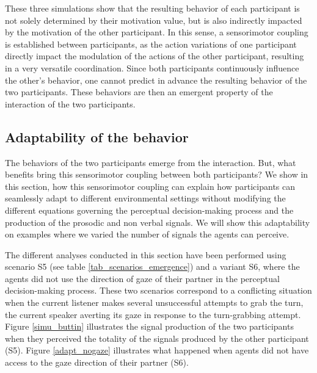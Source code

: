 These three simulations show that the resulting behavior of each participant is not solely determined by their motivation value, but is also indirectly impacted by the motivation of the other participant. In this sense, a sensorimotor coupling is established between participants, as the action variations of one participant directly impact the modulation of the actions of the other participant, resulting in a very versatile coordination. Since both participants continuously influence the other's behavior, one cannot predict in advance the resulting behavior of the two participants. These behaviors are then an emergent property of the interaction of the two participants. 

\subsection{Adaptability of the behavior}

The behaviors of the two participants emerge from the interaction. But, what benefits bring this sensorimotor coupling between both participants?
We show in this section, how this sensorimotor coupling can explain how participants can seamlessly adapt to different environmental settings without modifying the different equations governing the perceptual decision-making process and the production of the prosodic and non verbal signals. We will show this adaptability on examples where we varied the number of signals the agents can perceive. 


The different analyses conducted in this section have been performed using scenario S5 (see table \ref{tab_scenarios_emergence}) and a variant S6, where the agents did not use the direction of gaze of their partner in the perceptual decision-making process. 
These two scenarios correspond to a conflicting situation when the current listener makes several unsuccessful attempts to grab the turn, the current speaker averting its gaze in response to the turn-grabbing attempt. Figure \ref{simu_buttin} illustrates the signal production of the two participants when they perceived the totality of the signals produced by the other participant (S5). Figure \ref{adapt_nogaze} illustrates what happened when agents did not have access to the gaze direction of their partner (S6).

